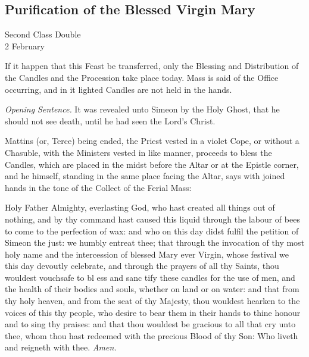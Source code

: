 \subsection{Purification of the Blessed Virgin Mary}
\begin{inhead}
    {Second Class Double\\
2 February}
\end{inhead}
\begin{rubric}
    If it happen that this Feast be transferred, only the Blessing and Distribution of the Candles and the Procession take place today. Mass is said of the Office occurring, and in it lighted Candles are not held in the hands.
\end{rubric}
\par\noindent
\textit{Opening Sentence.} It was revealed unto Simeon by the Holy Ghost, that he should not see death, until he had seen the Lord's Christ.

\begin{rubric}
    Mattins (or, Terce) being ended, the Priest vested in a violet Cope, or without a Chasuble, with the Ministers vested in like manner, proceeds to bless the Candles, which are placed in the midst before the Altar or at the Epistle corner, and he himself, standing in the same place facing the Altar, says with joined hands in the tone of the Collect of the Ferial Mass:
\end{rubric}
{} Holy Father Almighty, everlasting God, who hast created all things out of nothing, and by thy command hast caused this liquid through the labour of bees to come to the perfection of wax: and who on this day didst fulfil the petition of Simeon the just: we humbly entreat thee; that through the invocation of thy most holy name and the intercession of blessed Mary ever Virgin, whose festival we this day devoutly celebrate, and through the prayers of all thy Saints, thou wouldest vouchsafe to bl {} ess and sanc {} tify these candles for the use of men, and the health of their bodies and souls, whether on land or on water: and that from thy holy heaven, and from the seat of thy Majesty, thou wouldest hearken to the voices of this thy people, who desire to bear them in their hands to thine honour and to sing thy praises: and that thou wouldest be gracious to all that cry unto thee, whom thou hast redeemed with the precious Blood of thy Son: Who liveth and reigneth with thee. \textit{Amen.}\\

